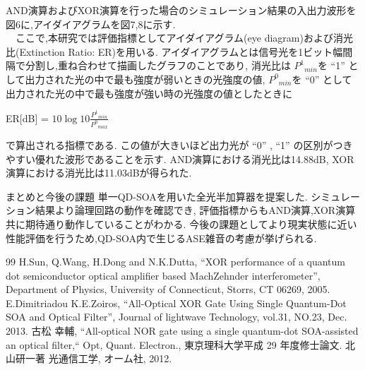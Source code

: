 \documentclass[dvipdfmx]{ujarticle}
\makeatletter
\def\section{\@startsection{section}{1}{\z@}
   {0.8\Cvs \@plus.5\Cdp \@minus.2\Cdp}
   {0.2\Cvs \@plus.3\Cdp}
   {\normalfont \Large \bfseries}}
\def\section{\@startsection{section}{1}{\z@}
   {0.8\Cvs \@plus.5\Cdp \@minus.2\Cdp}
   {0.2\Cvs \@plus.3\Cdp}
   {\normalfont \Large \bfseries}}
\makeatother
\begin{document}
  AND演算およびXOR演算を行った場合のシミュレーション結果の入出力波形を図6に,アイダイアグラムを図7,8に示す.\\
  　ここで,本研究では評価指標としてアイダイアグラム(eye diagram)および消光比(Extinction Ratio: ER)を用いる.
  アイダイアグラムとは信号光を1ビット幅間隔で分割し,重ね合わせて描画したグラフのことであり,
  消光比は ${P^1}_{min}$を “1” として出力された光の中で最も強度が弱いときの光強度の値,
  ${P^0}_{min}$を “0” として出力された光の中で最も強度が強い時の光強度の値としたときに\par
  \begin{center}
    ER[dB] = $10 \log{10}{\frac{{P^1}_{min}}{{P^0}_{max}}}$
  \end{center}
  で算出される指標である.
  この値が大きいほど出力光が “0” , “1” の区別がつきやすい優れた波形であることを示す.
  AND演算における消光比は14.88dB, XOR演算における消光比は11.03dBが得られた.
\section{まとめと今後の課題}
  単一QD-SOAを用いた全光半加算器を提案した.
  シミュレーション結果より論理回路の動作を確認でき, 評価指標からもAND演算,XOR演算共に期待通り動作していることがわかる.
  今後の課題としてより現実状態に近い性能評価を行うため,QD-SOA内で生じるASE雑音の考慮が挙げられる.

\begin{thebibliography} {99}
   H.Sun, Q.Wang, H.Dong and N.K.Dutta, “XOR performance of a quantum dot semiconductor optical amplifier based MachZehnder interferometer”, Department of Physics, University of Connecticut, Storrs, CT 06269, 2005.
   E.Dimitriadou K.E.Zoiros, “All-Optical XOR Gate Using Single Quantum-Dot SOA and Optical Filter”, Journal of lightwave Technology, vol.31, NO.23, Dec. 2013.
   古松 幸輔, “All-optical NOR gate using a single quantum-dot SOA-assisted an optical filter,“ Opt, Quant. Electron., 東京理科大学平成 29 年度修士論文.
   北山研一著 光通信工学, オーム社, 2012.
\end{thebibliography}
\end{document}
